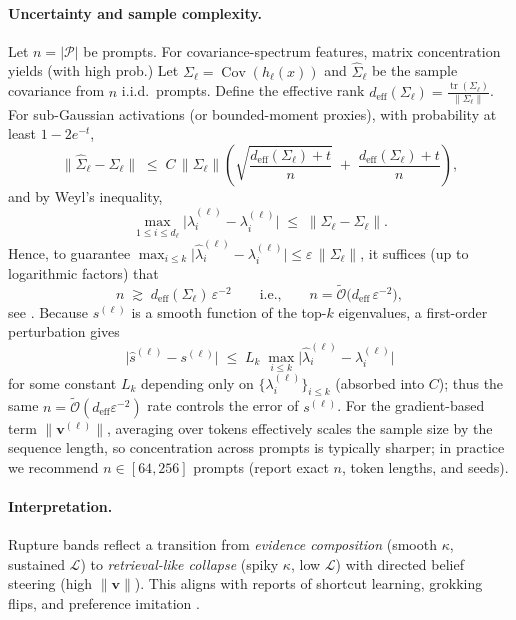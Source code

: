 \documentclass[11pt]{article}
\begin{document}
\paragraph{Uncertainty and sample complexity.}
Let $n=|\mathcal{P}|$ be prompts. For covariance-spectrum features, matrix concentration yields (with high prob.)
Let \(\Sigma_\ell=\operatorname{Cov}(h_\ell(x))\) and \(\widehat{\Sigma}_\ell\) be the sample covariance from \(n\) i.i.d.\ prompts.
Define the effective rank \(d_{\mathrm{eff}}(\Sigma_\ell)=\tfrac{\operatorname{tr}(\Sigma_\ell)}{\|\Sigma_\ell\|}\).
For sub-Gaussian activations (or bounded-moment proxies), with probability at least \(1-2e^{-t}\),
\[
\big\|\widehat{\Sigma}_\ell-\Sigma_\ell\big\|
\;\le\;
C\,\|\Sigma_\ell\|\!\left(
\sqrt{\frac{d_{\mathrm{eff}}(\Sigma_\ell)+t}{n}}
\;+\;
\frac{d_{\mathrm{eff}}(\Sigma_\ell)+t}{n}
\right),
\]
and by Weyl’s inequality,
\[
\max_{1\le i\le d_\ell}\big|\widehat{\lambda}^{(\ell)}_i-\lambda^{(\ell)}_i\big|
\;\le\;
\big\|\widehat{\Sigma}_\ell-\Sigma_\ell\big\|.
\]
Hence, to guarantee \(\max_{i\le k}\big|\widehat{\lambda}^{(\ell)}_i-\lambda^{(\ell)}_i\big|\le \varepsilon\,\|\Sigma_\ell\|\),
it suffices (up to logarithmic factors) that
\[
n \;\gtrsim\; d_{\mathrm{eff}}(\Sigma_\ell)\,\varepsilon^{-2}
\qquad\text{i.e.,}\qquad
n=\tilde{\mathcal{O}}\!\big(d_{\mathrm{eff}}\,\varepsilon^{-2}\big),
\]
see \citet{vershynin2018hdp}.
Because \(s^{(\ell)}\) is a smooth function of the top-\(k\) eigenvalues,
a first-order perturbation gives
\[
\big|\widehat{s}^{(\ell)}-s^{(\ell)}\big|
\;\le\;
L_k\;\max_{i\le k}\big|\widehat{\lambda}^{(\ell)}_i-\lambda^{(\ell)}_i\big|
\]
for some constant \(L_k\) depending only on \(\{\lambda^{(\ell)}_i\}_{i\le k}\) (absorbed into \(C\));
thus the same \(n=\tilde{\mathcal{O}}(d_{\mathrm{eff}}\varepsilon^{-2})\) rate controls the error of \(s^{(\ell)}\).
For the gradient-based term \(\|\mathbf{v}^{(\ell)}\|\), averaging over tokens effectively scales the sample size by the sequence length, so concentration across prompts is typically sharper; in practice we recommend \(n\in[64,256]\) prompts (report exact \(n\), token lengths, and seeds).


\paragraph{Interpretation.}
Rupture bands reflect a transition from \emph{evidence composition} (smooth $\kappa$, sustained $\mathcal{L}$) to \emph{retrieval-like collapse} (spiky $\kappa$, low $\mathcal{L}$) with directed belief steering (high $\|\mathbf{v}\|$). This aligns with reports of shortcut learning, grokking flips, and preference imitation \citep{geirhos2020shortcut,power2022grokking,wang2023selfinstruct,bai2022harmless}.
\end{document}
